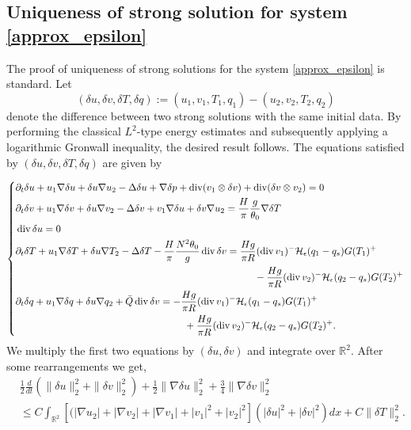 \documentclass[11pt, a4paper, article,reqno,]{amsart}
\theoremstyle{remark}
\DeclareMathOperator{\dive}{div}
\numberwithin{equation}{section}
\begin{document}
\subsection{Uniqueness of strong solution for system \eqref{approx_epsilon}}\label{unique_1}
The proof of uniqueness of strong solutions for the system \eqref{approx_epsilon} is standard. Let
$$
(\delta u, \delta v, \delta T, \delta q) := (u_1, v_1, T_1, q_1) - (u_2, v_2, T_2, q_2)
$$
denote the difference between two strong solutions with the same initial data. By performing the classical $L^2$-type energy estimates and subsequently applying a logarithmic Gronwall inequality, the desired result follows. The equations satisfied by $(\delta u, \delta v, \delta T, \delta q)$ are given by

\begin{equation*}
\left\{
    \begin{aligned}
     &\partial_t \delta u + u_1 \nabla \delta u + \delta u \nabla u_2 - \Delta \delta u + \nabla \delta p + \dive (v_1 \otimes \delta v) + \dive (\delta v \otimes v_2) = 0 \\
    &\partial_t \delta v + u_1 \nabla \delta v + \delta u \nabla v_2 - \Delta \delta v + v_1 \nabla \delta u + \delta v \nabla u_2 = \frac{H}{\pi} \frac{g}{\theta_0} \nabla \delta T \\
    &\dive \delta u  = 0 \\
    &\partial_t \delta T + u_1 \nabla \delta T + \delta u \nabla T_{2} - \Delta \delta T - \frac{H}{\pi}\frac{N^2 \theta_0}{g} \dive  \delta v  = \frac{H g}{\pi R}(\dive v_1)^- \mathcal{H}_\epsilon(q_1-q_s) G(T_1)^+  \\
    & \hspace{8.5cm}- \frac{H g}{\pi R} (\dive v_2)^- \mathcal{H}_\epsilon(q_2-q_s) G(T_2)^+ \\
    &\partial_t \delta q + u_1 \nabla \delta q + \delta u \nabla q_2 + \bar{Q} \dive \delta v  = -  \frac{H g}{\pi R}(\dive v_1)^- \mathcal{H}_\epsilon(q_1-q_s)G(T_1)^+ \\
    & \hspace{6cm}+ \frac{H g}{\pi R} (\dive v_2)^- \mathcal{H}_\epsilon(q_2-q_s) G(T_2)^+. 
\end{aligned}\right.
\end{equation*}
We multiply the first two equations by $(\delta u, \delta v)$ and integrate over $\mathbb{R}^2$. After some rearrangements we get,
\begin{equation}\label{pt_1_1}
    \begin{aligned}
        & \frac{1}{2} \frac{d}{dt} \left( \|\delta u\|_2^2 + \|\delta v\|_2^2  \right) + \frac{1}{2}\|\nabla \delta u\|_2^2 + \frac{3}{4}\|\nabla \delta v\|_2^2 \\
        & \leq C \int_{\mathbb{R}^2}[(|\nabla u_2|+ |\nabla v_2| + |\nabla v_1| + |v_1|^2 + |v_2|^2] (|\delta u|^2 + |\delta v|^2)  dx + C \|\delta T\|_2^2.
    \end{aligned}
\end{equation}
\end{document}
